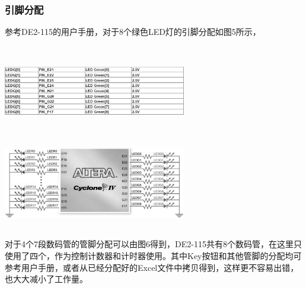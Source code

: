 \documentclass[UTF8]{ctexart}
\makeatletter
\newcommand{\figcaption}{\def\@captype{figure}\caption}
\makeatother
\begin{document}
\subsubsection{引脚分配}
参考DE2-115的用户手册，对于8个绿色LED灯的引脚分配如图5所示，
\begin{center}
	\includegraphics[width=8cm,height=4cm]{ledgpin.eps}
	\includegraphics[width=8cm,height=4cm]{ledlianjie.eps}
	\figcaption{(1)LED管脚分配；(2)LED与FPGA连接}\label{leds.eps}
\end{center}

对于4个7段数码管的管脚分配可以由图6得到，DE2-115共有8个数码管，在这里只使用了四个，作为控制计数器和计时器使用。其中Key按钮和其他管脚的分配均可参考用户手册，或者从已经分配好的Excel文件中拷贝得到，这样更不容易出错，也大大减小了工作量。
\end{document}
